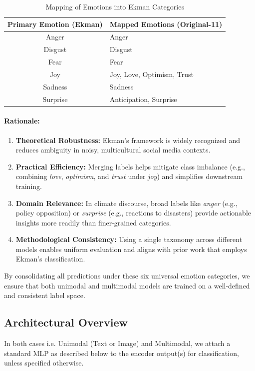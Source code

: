 \begin{table}[h]
    \centering
    \begin{tabular}{|c|l|}
        \hline
        \textbf{Primary Emotion (Ekman)} & \textbf{Mapped Emotions (Original-11)} \\
        \hline
        Anger     & Anger \\
        Disgust   & Disgust \\
        Fear      & Fear \\
        Joy       & Joy, Love, Optimism, Trust \\
        Sadness   & Sadness \\
        Surprise  & Anticipation, Surprise \\
        \hline
    \end{tabular}
    \caption{Mapping of Emotions into Ekman Categories}
    \label{tab:emotion_mapping}
\end{table}

\paragraph{Rationale:}
\begin{enumerate}
    \item \textbf{Theoretical Robustness:} Ekman’s framework is widely recognized and reduces ambiguity in noisy, multicultural social media contexts.
    \item \textbf{Practical Efficiency:} Merging labels helps mitigate class imbalance (e.g., combining \emph{love}, \emph{optimism}, and \emph{trust} under \emph{joy}) and simplifies downstream training.
    \item \textbf{Domain Relevance:} In climate discourse, broad labels like \emph{anger} (e.g., policy opposition) or \emph{surprise} (e.g., reactions to disasters) provide actionable insights more readily than finer-grained categories.
    \item \textbf{Methodological Consistency:} Using a single taxonomy across different models enables uniform evaluation and aligns with prior work that employs Ekman’s classification.
\end{enumerate}

By consolidating all predictions under these six universal emotion categories, we ensure that both unimodal and multimodal models are trained on a well-defined and consistent label space.


\subsection{Architectural Overview}
In both cases i.e. Unimodal (Text or Image) and Multimodal, we attach a standard MLP as described below to the encoder output(s) for classification, unless specified otherwise. 

